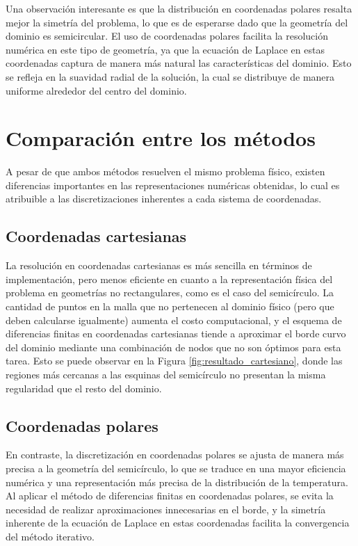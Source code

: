 Una observación interesante es que la distribución en coordenadas polares resalta mejor la simetría del problema, lo que es de esperarse dado que la geometría del dominio es semicircular. El uso de coordenadas polares facilita la resolución numérica en este tipo de geometría, ya que la ecuación de Laplace en estas coordenadas captura de manera más natural las características del dominio. Esto se refleja en la suavidad radial de la solución, la cual se distribuye de manera uniforme alrededor del centro del dominio.

\section{Comparación entre los métodos}

A pesar de que ambos métodos resuelven el mismo problema físico, existen diferencias importantes en las representaciones numéricas obtenidas, lo cual es atribuible a las discretizaciones inherentes a cada sistema de coordenadas.

\subsection{Coordenadas cartesianas}

La resolución en coordenadas cartesianas es más sencilla en términos de implementación, pero menos eficiente en cuanto a la representación física del problema en geometrías no rectangulares, como es el caso del semicírculo. La cantidad de puntos en la malla que no pertenecen al dominio físico (pero que deben calcularse igualmente) aumenta el costo computacional, y el esquema de diferencias finitas en coordenadas cartesianas tiende a aproximar el borde curvo del dominio mediante una combinación de nodos que no son óptimos para esta tarea. Esto se puede observar en la Figura \ref{fig:resultado_cartesiano}, donde las regiones más cercanas a las esquinas del semicírculo no presentan la misma regularidad que el resto del dominio.

\subsection{Coordenadas polares}

En contraste, la discretización en coordenadas polares se ajusta de manera más precisa a la geometría del semicírculo, lo que se traduce en una mayor eficiencia numérica y una representación más precisa de la distribución de la temperatura. Al aplicar el método de diferencias finitas en coordenadas polares, se evita la necesidad de realizar aproximaciones innecesarias en el borde, y la simetría inherente de la ecuación de Laplace en estas coordenadas facilita la convergencia del método iterativo.

